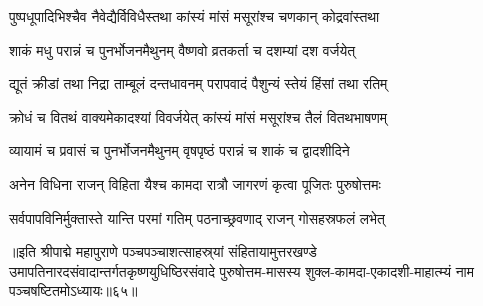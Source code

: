 \twolineshloka
{पुष्पधूपादिभिश्चैव नैवेद्यैर्विविधैस्तथा}
{कांस्यं मांसं मसूरांश्च चणकान् कोद्रवांस्तथा}%

\twolineshloka
{शाकं मधु परान्नं च पुनर्भोजनमैथुनम्}
{वैष्णवो व्रतकर्ता च दशम्यां दश वर्जयेत्}%

\twolineshloka
{द्यूतं क्रीडां तथा निद्रा ताम्बूलं दन्तधावनम्}
{परापवादं पैशुन्यं स्तेयं हिंसां तथा रतिम्}%

\twolineshloka
{क्रोधं च वितथं वाक्यमेकादश्यां विवर्जयेत्}
{कांस्यं मांसं मसूरांश्च तैलं वितथभाषणम्}%

\twolineshloka
{व्यायामं च प्रवासं च पुनर्भोजनमैथुनम्}
{वृषपृष्ठं परान्नं च शाकं च द्वादशीदिने}%

\twolineshloka
{अनेन विधिना राजन् विहिता यैश्च कामदा}
{रात्रौ जागरणं कृत्वा पूजितः पुरुषोत्तमः}%

\twolineshloka
{सर्वपापविनिर्मुक्तास्ते यान्ति परमां गतिम्}
{पठनाच्छ्रवणाद् राजन् गोसहस्रफलं लभेत्}%

॥इति श्रीपाद्मे महापुराणे पञ्चपञ्चाशत्साहस्र्यां संहितायामुत्तरखण्डे उमापतिनारदसंवादान्तर्गतकृष्णयुधिष्ठिरसंवादे पुरुषोत्तम-मासस्य शुक्ल-कामदा-एकादशी-माहात्म्यं नाम पञ्चषष्टितमोऽध्यायः॥६५॥

\genMangalaShloka

\hyperref[sec:ekadashi_mahatmyam_padma_puranam]{\closesub}

